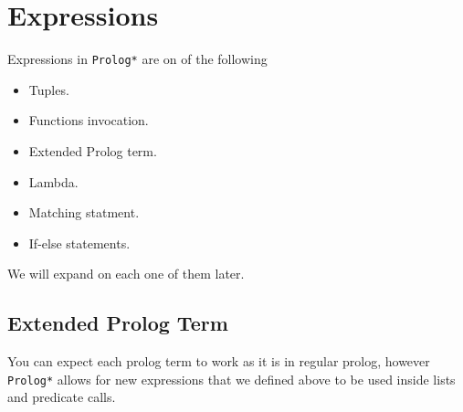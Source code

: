 \section{Expressions}

Expressions in \texttt{Prolog*} are on of the following
\begin{itemize}
    \item Tuples.
    \item Functions invocation.
    \item Extended Prolog term. 
    \item Lambda.
    \item Matching statment.
    \item If-else statements.
\end{itemize}

We will expand on each one of them later.

\subsection{Extended Prolog Term}

You can expect each prolog term to work as it is in regular prolog, however
\texttt{Prolog*} allows for new expressions that we defined above to be used inside lists
and predicate calls.

